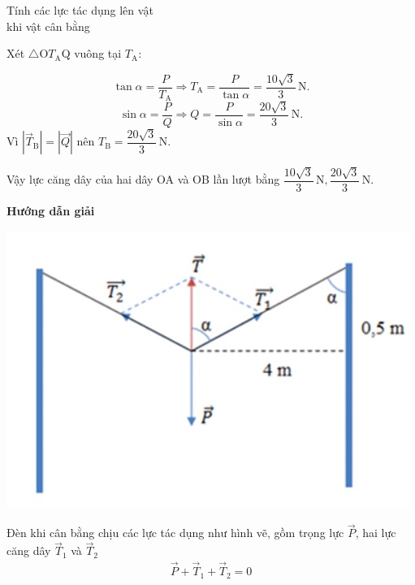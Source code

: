 \begin{dang}{Tính các lực tác dụng lên vật \\khi vật cân bằng}
{		Xét $\triangle$O$T_\text{A}$Q vuông tại $T_\text{A}$:
		
		$$\tan \alpha =\dfrac{P}{T_\text{A}}\Rightarrow T_\text{A}=\dfrac{P}{\tan \alpha}=\dfrac{10\sqrt{3}}{3}\,\text{N}.$$
		$$\sin \alpha =\dfrac{P}{Q}\Rightarrow Q=\dfrac{P}{\sin \alpha}=\dfrac{20\sqrt{3}}{3}\,\text{N}.$$
		Vì $|\vec{T}_\textrm{B}|=|\vec{Q}|$ nên $T_\textrm{B}= \dfrac{20\sqrt{3}}{3}\,\text{N}.$
		
		Vậy lực căng dây của hai dây OA và OB lần lượt bằng $\dfrac{10\sqrt{3}}{3}\,\text{N}, \dfrac{20\sqrt{3}}{3}\,\text{N}.$
	}
	{	\begin{center}
			\textbf{Hướng dẫn giải}
		\end{center}
		
		\begin{center}
			\includegraphics[scale=0.5]{../figs/VN10-PH-11-L-008-4-V2-04.jpg}
		\end{center}
		Đèn khi cân bằng chịu các lực tác dụng như hình vẽ, gồm trọng lực $\vec{P}$, hai lực căng dây $\vec{T}_1$ và $\vec{T}_2$
			\begin{align*}
				\vec{P}+\vec{T}_1+\vec{T}_2=0
			\end{align*}
		
}
\end{dang}
